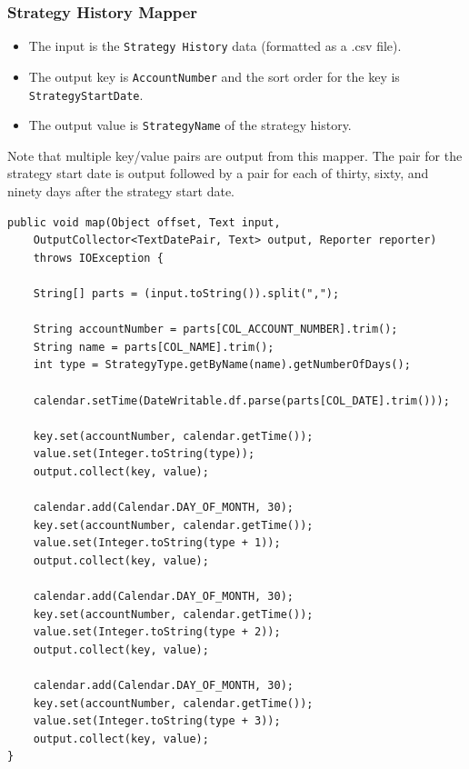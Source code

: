 \subsubsection{Strategy History Mapper}
\begin{itemize}
 \item The input is the \texttt{Strategy History} data (formatted as a .csv
file).
 \item The output key is \texttt{AccountNumber} and the sort order for the key is \texttt{StrategyStartDate}.
 \item The output value is \texttt{StrategyName} of the strategy history. 
\end{itemize}
Note that multiple key/value pairs are output from this mapper. The pair for the strategy start date is output followed by a pair for each of thirty, sixty, and ninety days after the strategy start date.

{
\singlespace
\small
\begin{verbatim}
public void map(Object offset, Text input, 
    OutputCollector<TextDatePair, Text> output, Reporter reporter) 
    throws IOException {

    String[] parts = (input.toString()).split(",");

    String accountNumber = parts[COL_ACCOUNT_NUMBER].trim();
    String name = parts[COL_NAME].trim();
    int type = StrategyType.getByName(name).getNumberOfDays();

    calendar.setTime(DateWritable.df.parse(parts[COL_DATE].trim()));

    key.set(accountNumber, calendar.getTime());
    value.set(Integer.toString(type));
    output.collect(key, value);

    calendar.add(Calendar.DAY_OF_MONTH, 30);
    key.set(accountNumber, calendar.getTime());
    value.set(Integer.toString(type + 1));
    output.collect(key, value);

    calendar.add(Calendar.DAY_OF_MONTH, 30);
    key.set(accountNumber, calendar.getTime());
    value.set(Integer.toString(type + 2));
    output.collect(key, value);

    calendar.add(Calendar.DAY_OF_MONTH, 30);
    key.set(accountNumber, calendar.getTime());
    value.set(Integer.toString(type + 3));
    output.collect(key, value);
}
\end{verbatim}
}

